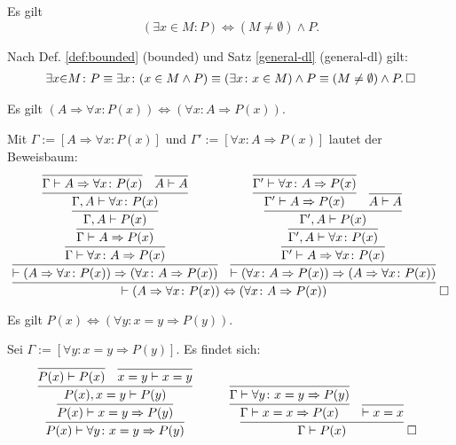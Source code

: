 \begin{Satz}
Es gilt
\[(\exists x{\in}M\colon P) \iff (M\ne\emptyset)\land P.\]
\end{Satz}

\begin{Beweis}
Nach Def. \ref{def:bounded} (bounded) und Satz
\ref{general-dl} (general-dl) gilt:
\begin{gather*}
\exists x{\in}M\colon P \equiv \exists x\colon (x\in M\land P)
\equiv (\exists x\colon x\in M)\land P\equiv (M\ne\emptyset)\land P.\,\square
\end{gather*}
\end{Beweis}

\begin{Satz}\label{imp-dl}
Es gilt $(A\Rightarrow\forall x\colon P(x))\Leftrightarrow (\forall x\colon A\Rightarrow P(x))$.
\end{Satz}
\begin{Beweis}
Mit $\Gamma:=[A\Rightarrow\forall x\colon P(x)]$
und $\Gamma':=[\forall x\colon A\Rightarrow P(x)]$
lautet der Beweisbaum:
\[
\infer{\vdash (A\Rightarrow\forall x\colon P(x))\Leftrightarrow (\forall x\colon A\Rightarrow P(x))}{
  \infer{\vdash (A\Rightarrow\forall x\colon P(x))\Rightarrow (\forall x\colon A\Rightarrow P(x))}{
    \infer{\Gamma\vdash\forall x\colon A\Rightarrow P(x)}{
      \infer{\Gamma\vdash A\Rightarrow P(x)}{
        \infer{\Gamma, A\vdash P(x)}{
          \infer{\Gamma, A\vdash\forall x\colon P(x)}{
            \infer{\Gamma\vdash A\Rightarrow\forall x\colon P(x)}{}
          & \infer{A\vdash A}{}}}}}}
& \infer{\vdash (\forall x\colon A\Rightarrow P(x))\Rightarrow (A\Rightarrow\forall x\colon P(x))}{
    \infer{\Gamma'\vdash A\Rightarrow\forall x\colon P(x)}{
      \infer{\Gamma', A\vdash\forall x\colon P(x)}{
        \infer{\Gamma', A\vdash P(x)}{
          \infer{\Gamma'\vdash A\Rightarrow P(x)}{
            \infer{\Gamma'\vdash\forall x\colon A\Rightarrow P(x)}{}
          }
        & \infer{A\vdash A}{}}}}}}\;\qedsymbol
\]
\end{Beweis}

\begin{Satz}\label{redundant-eq}
Es gilt $P(x)\Leftrightarrow (\forall y\colon x=y\Rightarrow P(y))$.
\end{Satz}
\begin{Beweis}
Sei $\Gamma:=[\forall y\colon x=y\Rightarrow P(y)]$. Es findet sich:
\[
\begin{array}{@{}l@{\qquad\quad}l}
\infer{P(x)\vdash\forall y\colon x=y\Rightarrow P(y)}{
  \infer{P(x)\vdash x=y\Rightarrow P(y)}{
    \infer{P(x),x=y\vdash P(y)}{
      \infer{P(x)\vdash P(x)}{} & \infer{x=y\vdash x=y}{}}}}
&
\infer{\Gamma\vdash P(x)}{
  \infer{\Gamma\vdash x=x\Rightarrow P(x)}{
    \infer{\Gamma\vdash\forall y\colon x=y\Rightarrow P(y)}{}}
& \infer{\vdash x=x}{}}\;\qedsymbol
\end{array}
\]
\end{Beweis}

